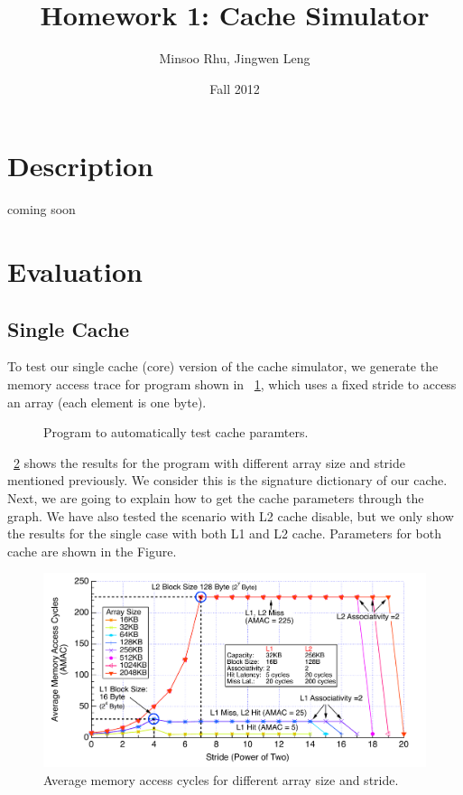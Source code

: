 \documentclass[12pt]{report}
\newcommand{\Fig}[1]{\figurename~\ref{#1}}
\begin{document}

\title{Homework 1: Cache Simulator}
\author{Minsoo Rhu, Jingwen Leng}
\date{Fall 2012}
\maketitle


\section{Description}
 coming soon

\newpage
\section{Evaluation}
\subsection{Single Cache}
\label{single_cache}
To test our single cache (core) version of the cache simulator, we generate the memory access trace for program shown in \Fig{fig:autotest}, which uses a fixed stride to access an array (each element is one byte). 

\begin{figure}[ht]

\caption{Program to automatically test cache paramters.}
\label{fig:autotest}
\end{figure}

\Fig{fig:autotest_result} shows the results for the program with different array size and stride mentioned previously. We consider this is the signature dictionary of our cache. Next, we are going to explain how to get the cache parameters through the graph. We have also tested the scenario with L2 cache disable, but we only show the results for the single case with both L1 and L2 cache. Parameters for both cache are shown in the Figure.

\begin{figure}[!h]
\begin{minipage}[b]{\textwidth}
 \centering
 \includegraphics[trim=0mm 0mm 0mm 0mm,clip,width=\linewidth]{figs/autotest.pdf}
 \caption{Average memory access cycles for different array size and stride.}
 \label{fig:autotest_result}
\end{minipage}
\end{figure}
\end{document}
